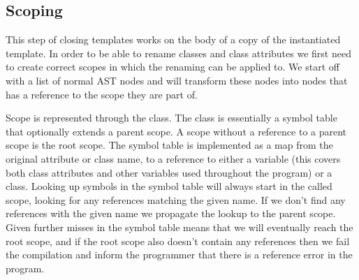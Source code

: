 %
%

\subsection{Scoping}\label{subsec:inst-scoping}

This step of closing templates works on the body of a copy of the instantiated template.
In order to be able to rename classes and class attributes we first need to create correct scopes in which the renaming can be applied to.
We start off with a list of normal AST nodes and will transform these nodes into nodes that has a reference to the scope they are part of.

Scope is represented through the  class.
The  class is essentially a symbol table that optionally extends a parent scope.
A scope without a reference to a parent scope is the root scope.
The symbol table is implemented as a map from the original attribute or class name, to a reference to either a variable (this covers both class attributes and other variables used throughout the program) or a class.
Looking up symbols in the symbol table will always start in the called scope, looking for any references matching the given name.
If we don't find any references with the given name we propagate the lookup to the parent scope.
Given further misses in the symbol table means that we will eventually reach the root scope, and if the root scope also doesn't contain any references then we fail the compilation and inform the programmer that there is a reference error in the program.

